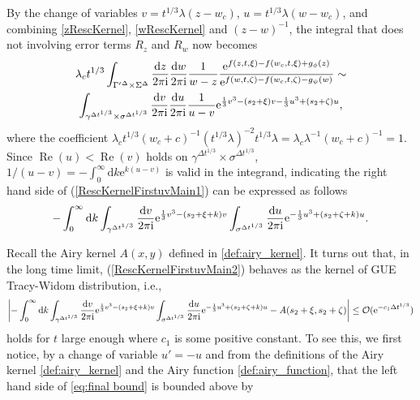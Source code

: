\documentclass[cmp]{svjour}
\numberwithin{theorem}{section}
\numberwithin{equation}{section}
\def\ii{{\rm i}}
\DeclareMathOperator{\R}{Re}
\begin{document}
By the change of variables $v = t^{1/3} \lambda (z - w_c)$, $u = t^{1/3} \lambda (w - w_c)$, and combining \eqref{zRescKernel}, \eqref{wRescKernel} and $(z-w)^{-1}$, the integral that does not involving error terms $R_z$ and $R_w$ now becomes
\begin{multline}\label{RescKernelFirstuvMain1}
	\lambda_c t^{1/3} \int_{{\Gamma'}^{\Delta } \times {\Sigma}^{\Delta }} \frac{\mathrm{d} z}{2 \pi \ii} \frac{\mathrm{d} w}{2 \pi \ii} \frac{1}{ w-z}  \frac{ \mathrm{e}^{ f(z, t,\xi) - f(w_c , t, \xi) + g_{\phi}(z)} }{ \mathrm{e}^{ f(w, t,\zeta) - f(w_c , t, \zeta) - g_{\psi}(w)}  } \sim \\  \int_{\gamma^{\Delta t^{1/3}} \times \sigma^{\Delta t^{1/3}}} \frac{\mathrm{d} v}{2 \pi \ii} \frac{\mathrm{d} u}{2 \pi \ii} \frac{1}{u - v}\mathrm{e}^{  \frac{1}{3} v^3 - (s_2 + \xi ) v -  \frac{1}{3} {u}^3 + (s_2 + \zeta ) u},
\end{multline}
where the coefficient $\lambda_c t^{1/3} (w_c + c)^{-1} (t^{1/3} \lambda)^{-2} t^{1/3} \lambda = \lambda_c \lambda^{-1} (w_c + c)^{-1} = 1$. Since $\R(u) < \R(v)$ holds on $\gamma^{\Delta t^{1/3}} \times \sigma^{\Delta t^{1/3}}$, $1/(u - v) = - \int_{0}^{\infty} \mathrm{d} k \mathrm{e}^{ k (u - v) }$  is valid in the integrand, indicating the right hand side of (\ref{RescKernelFirstuvMain1}) can be expressed as follows
\begin{equation}\label{RescKernelFirstuvMain2}
	-\int_{0}^{\infty} \mathrm{d} k \int_{\gamma^{\Delta t^{1/3}}} \frac{\mathrm{d} v}{2 \pi \ii} \mathrm{e}^{  \frac{1}{3} v^3 - (s_2 + \xi + k) v}  \int_{ \sigma^{\Delta t^{1/3}}} \frac{\mathrm{d} u}{2 \pi \ii} \mathrm{e}^{  -\frac{1}{3} {u}^3 + (s_2 + \zeta + k) u}.
\end{equation}

Recall the Airy kernel $A(x,y)$ defined in \eqref{def:airy_kernel}. It turns out that, in the long time limit, (\ref{RescKernelFirstuvMain2}) behaves as the kernel of  GUE Tracy-Widom distribution, i.e.,
\begin{align}
	\left|- \int_{0}^{\infty} \mathrm{d} k \int_{\gamma^{\Delta t^{1/3}}} \frac{\mathrm{d} v}{2 \pi \ii} \mathrm{e}^{  \frac{1}{3} v^3 - (s_2 + \xi + k) v}  \int_{ \sigma^{\Delta t^{1/3}}} \frac{\mathrm{d} u}{2 \pi \ii} \mathrm{e}^{ - \frac{1}{3} {u}^3 + (s_2 + \zeta + k) u}   -A(s_2+\xi,s_2+\zeta) \right|
	\leq  \mathcal{O}( \mathrm{e}^{ - c_1 \Delta t^{1/3} } )
	\label{eq:final bound}
\end{align}
holds for $t$ large enough where $c_1$ is some positive constant. To see this, we first notice, by a change of variable $u' =-u$ and from the definitions of the Airy kernel \eqref{def:airy_kernel} and the Airy function \eqref{def:airy_function}, that the left hand side of \eqref{eq:final bound} is bounded above by
\end{document}
